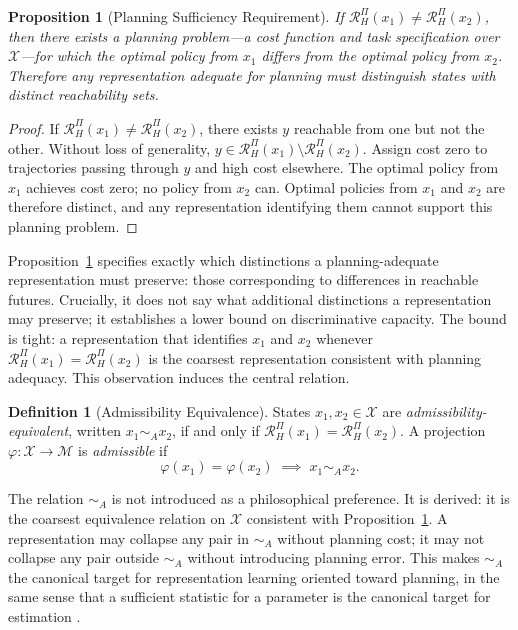 \documentclass[11pt, a4paper]{article}
\theoremstyle{plain}
\newtheorem{proposition}{Proposition}
\theoremstyle{definition}
\newtheorem{definition}{Definition}
\theoremstyle{remark}
\newcommand{\simA}{\sim_A}
\newcommand{\RHP}{\mathcal{R}_H^\Pi}
\begin{document}
\begin{proposition}[Planning Sufficiency Requirement]
\label{prop:planning}
If $\RHP(x_1) \neq \RHP(x_2)$, then there exists a planning problem---a cost
function and task specification over $\mathcal{X}$---for which the optimal policy
from $x_1$ differs from the optimal policy from $x_2$. Therefore any
representation adequate for planning must distinguish states with distinct
reachability sets.
\end{proposition}

\begin{proof}
If $\RHP(x_1) \neq \RHP(x_2)$, there exists $y$ reachable from one but not the
other. Without loss of generality, $y \in \RHP(x_1) \setminus \RHP(x_2)$.
Assign cost zero to trajectories passing through $y$ and high cost elsewhere.
The optimal policy from $x_1$ achieves cost zero; no policy from $x_2$ can.
Optimal policies from $x_1$ and $x_2$ are therefore distinct, and any
representation identifying them cannot support this planning problem.
\end{proof}

Proposition~\ref{prop:planning} specifies exactly which distinctions a
planning-adequate representation must preserve: those corresponding to differences
in reachable futures. Crucially, it does not say what additional distinctions a
representation may preserve; it establishes a lower bound on discriminative
capacity. The bound is tight: a representation that identifies $x_1$ and $x_2$
whenever $\RHP(x_1) = \RHP(x_2)$ is the coarsest representation consistent
with planning adequacy. This observation induces the central relation.

\begin{definition}[Admissibility Equivalence]
\label{def:admissibility}
States $x_1, x_2 \in \mathcal{X}$ are \emph{admissibility-equivalent},
written $x_1 \simA x_2$, if and only if $\RHP(x_1) = \RHP(x_2)$.
A projection $\varphi : \mathcal{X} \to \mathcal{M}$ is
\emph{admissible} if
\begin{equation}
  \varphi(x_1) = \varphi(x_2) \;\implies\; x_1 \simA x_2.
\end{equation}
\end{definition}

The relation $\simA$ is not introduced as a philosophical preference. It is derived:
it is the coarsest equivalence relation on $\mathcal{X}$ consistent with
Proposition~\ref{prop:planning}. A representation may collapse any pair
in $\simA$ without planning cost; it may not collapse any pair outside $\simA$
without introducing planning error. This makes $\simA$ the canonical target for
representation learning oriented toward planning, in the same sense that a
sufficient statistic for a parameter is the canonical target for
estimation \citep{fisher1922mathematical}.
\end{document}
